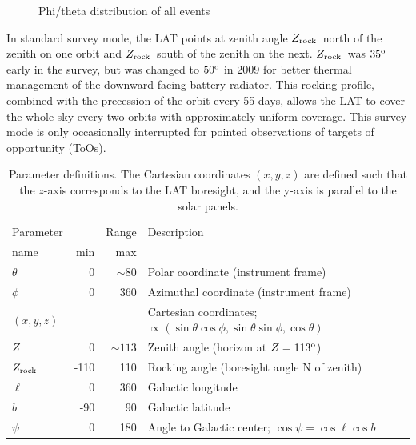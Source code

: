\documentclass[aps,twocolumn,prd,superscriptaddress,showpacs,nofootinbib,fixfloat]{revtex4}
\newcommand{\degree}{^{\rm o}}
\newcommand{\zrock}{$Z_{\rm rock}$}
\begin{document}
\begin{figure}[h]
  \begin{center}
  \end{center}
  \caption{Phi/theta distribution of all events}
  \label{fig:phiThetaDist}
\end{figure}

In standard survey mode, the LAT points at zenith angle \zrock\ north of the
zenith on one orbit and \zrock\ south of the zenith on the next.  \zrock\ was
$35\degree$ early in the survey, but was changed to $50\degree$ in 2009 for
better thermal management of the downward-facing battery radiator.  This
rocking profile, combined with the precession of the orbit every 55 days,
allows the LAT to cover the whole sky every two orbits with approximately
uniform coverage.  This survey mode is only occasionally interrupted for
pointed observations of targets of opportunity (ToOs). 

\begin{table}
\begin{center}
  \begin{tabular}{l|rr|l}
    \hline
    Parameter & & Range &  Description\\
    name      & min & max &            \\
    \hline
    $\theta$ &    0 &  $\sim80$ & Polar coordinate (instrument frame) \\
    $\phi$   &    0 &       360 & Azimuthal coordinate (instrument frame) \\
    $(x,y,z)$&      &     & Cartesian coordinates;
    $\propto(\sin\theta\cos\phi, \sin\theta\sin\phi, \cos\theta)$\\
    $Z$      &    0 & $\sim113$ & Zenith angle (horizon at $Z=113\degree$) \\
    \zrock\  & -110 & 110 & Rocking angle (boresight angle N of zenith) \\
    $\ell$   &    0 & 360 & Galactic longitude \\
    $b$      &  -90 &  90 & Galactic latitude \\
    $\psi$   &    0 & 180 & Angle to Galactic center; $\cos\psi=\cos\ell\cos b$ \\
    \hline
  \end{tabular}
  \caption{Parameter definitions. The Cartesian coordinates $(x, y, z)$ are
  defined such that the $z$-axis corresponds to the LAT boresight, and the
  y-axis is parallel to the solar panels.}
  \label{tab:eventRatios}
\end{center}
\end{table}
\end{document}
